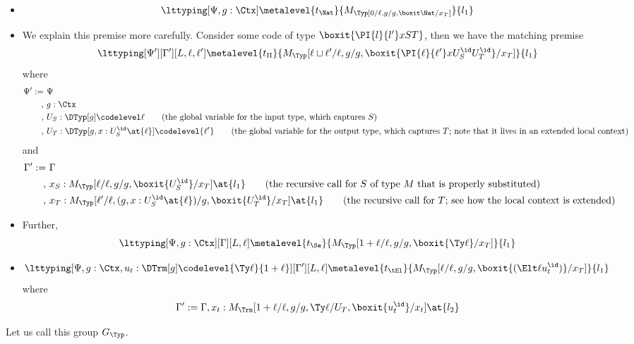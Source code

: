 \begin{itemize}
\item 
  \[
    \lttyping[\Psi, g : \Ctx]\metalevel{t_\Nat}{M_\Typ[0/\ell,g/g,\boxit \Nat/x_T]}{l_1}
  \]
\item We explain this premise more carefully. Consider some code of type
  $\boxit{\PI{l}{l'}x S T}$, then we have the matching premise
  \[
    \lttyping[\Psi'][\Gamma'][L,\ell,\ell']\metalevel{t_\Pi}{M_\Typ[\ell\sqcup \ell'/\ell,g/g,\boxit{\PI{\ell}{\ell'}x{U_S^\id}{U_T^\id}}/x_T]}{l_1}
  \]
  where
  \begin{align*}
    \Psi' :=&~ \Psi \\
    ,&~ g : \Ctx \\
    ,&~U_S : \DTyp[g] \codelevel \ell
       \tag{the global variable for the input type, which captures $S$}\\
    ,&~U_T :\DTyp[g,x:U_S^\id \at{\ell}]\codelevel {\ell'}
       \tag{the global variable for the output type, which captures $T$; note that it
       lives in an extended local context}
  \end{align*}
  and
  \begin{align*}
    \Gamma' :=&~ \Gamma \\
    ,&~ x_S: M_\Typ[\ell/\ell,g/g,\boxit{U_S^\id}/x_T] \at{l_1}
       \tag{the recursive call for $S$ of type $M$ that is properly substituted}\\
    ,&~x_T:M_\Typ[\ell'/\ell,(g,x:U_S^\id \at{\ell})/g,\boxit{U_T^\id}/x_T]\at {l_1}
       \tag{the recursive call for $T$; see how the local context is extended}
  \end{align*}
\item
  Further,
  \[
    \lttyping[\Psi,g:\Ctx][\Gamma][L,\ell]\metalevel{t_\Se}{M_\Typ[1 + \ell/\ell,g/g,\boxit{\Ty \ell}/x_T]}{l_1}
  \]
\item
  \[
    \lttyping[\Psi,g:\Ctx, u_t:\DTrm[g]\codelevel{\Ty \ell}{1 + \ell}][\Gamma'][L,\ell]\metalevel{t_\tEl}{M_\Typ[\ell/\ell,g/g,\boxit{(\Elt \ell{u_t^\id})}/x_T]}{l_1}
  \]
  where
  \[
    \Gamma' := \Gamma, x_t : M_\Trm[1 + \ell/\ell,g/g,\Ty \ell/U_T,\boxit{u_t^\id}/x_t]  \at{l_2}
  \]
\end{itemize}
Let us call this group $G_\Typ$. 

